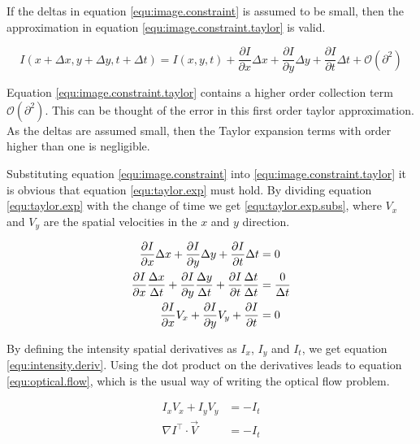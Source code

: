 If the deltas in equation \eqref{equ:image.constraint} is assumed to be small, then the approximation in equation \eqref{equ:image.constraint.taylor} is valid.

\begin{equation}\label{equ:image.constraint.taylor}
	I(x + \Delta x, y+ \Delta y, t + \Delta t) = I(x,y,t) + \frac{\partial I}{\partial x} \Delta x + 
		\frac{\partial I}{\partial y} \Delta y + \frac{\partial I}{\partial t} \Delta t + \mathcal{O}(\partial^2)
\end{equation}

Equation \eqref{equ:image.constraint.taylor} contains a higher order collection term $\mathcal{O}(\partial^2)$. This can be thought of the error in this first order taylor approximation. As
the deltas are assumed small, then the Taylor expansion terms with order higher than one is negligible. 

Substituting equation \eqref{equ:image.constraint} into \eqref{equ:image.constraint.taylor} it is obvious that equation \eqref{equ:taylor.exp} must hold. 
By dividing equation \eqref{equ:taylor.exp} with the change of time we get \eqref{equ:taylor.exp.subs}, where $V_x$ and $V_y$ are the spatial velocities in the 
$x$ and $y$ direction.

\begin{align}
	\frac{\partial I}{\partial x} \Delta x + \frac{\partial I}{\partial y} \Delta y + 
		\frac{\partial I}{\partial t} \Delta t &= 0 \label{equ:taylor.exp} \\
	\frac{\partial I}{\partial x} \frac{\Delta x}{\Delta t} + \frac{\partial I}{\partial y} \frac{\Delta y}{\Delta t} + 
		\frac{\partial I}{\partial t} \frac{\Delta t}{\Delta t} &= \frac{0}{\Delta t} \notag \\
	\frac{\partial I}{\partial x} V_x + \frac{\partial I}{\partial y} V_y + \frac{\partial I}{\partial t}  &= 0 \label{equ:taylor.exp.subs}
\end{align}

By defining the intensity spatial derivatives as $I_x$, $I_y$ and $I_t$, we get equation \eqref{equ:intensity.deriv}. Using the dot product on the derivatives 
leads to equation \eqref{equ:optical.flow}, which is the usual way of writing the optical flow problem.

\begin{align}
	I_x V_x + I_y V_y &= -I_t \label{equ:intensity.deriv} \\
	\nabla I^\top \cdot \vec{V} &= -I_t \label{equ:optical.flow}
\end{align}

